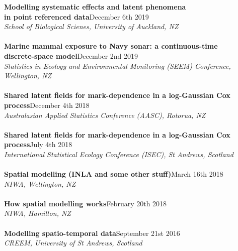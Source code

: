 \documentclass[10pt,letter]{article}
\begin{document}
                           {\textbf{Modelling systematic effects and latent phenomena \\
                                         in point referenced data}}\hfill December 6th 2019\\
                                     {\sl School of Biological Scienes, University of Auckland, NZ}\\
                                     \hdashrule[0.5ex]{4cm}{1pt}{1pt}\\
                                               {\textbf{Marine mammal exposure to Navy sonar: a continuous-time \\
                                                   discrete-space model}}\hfill December 2nd 2019\\
                                               {\sl Statistics in Ecology and Environmental Monitoring (SEEM) Conference, Wellington, NZ}\\
                                               \hdashrule[0.5ex]{4cm}{1pt}{1pt}\\
                                                         {\textbf{Shared latent fields for mark-dependence in a log-Gaussian Cox process}}\hfill December 4th 2018\\
                                                         {\sl Australasian Applied Statistics Conference (AASC), Rotorua, NZ}\\
 \hdashrule[0.5ex]{4cm}{1pt}{1pt}\\
{\textbf{Shared latent fields for mark-dependence in a log-Gaussian Cox process}}\hfill July 4th 2018\\
 {\sl International Statistical Ecology Conference (ISEC), St Andrews, Scotland}\\
 \hdashrule[0.5ex]{4cm}{1pt}{1pt}\\
{\textbf{Spatial modelling (INLA and some other stuff)}}\hfill March 16th 2018\\
 {\sl NIWA, Wellington, NZ}\\
 \hdashrule[0.5ex]{4cm}{1pt}{1pt}\\
 \noindent
{\textbf{How spatial modelling works}}\hfill February 20th 2018\\
 {\sl NIWA, Hamilton, NZ}\\
\hdashrule[0.5ex]{4cm}{1pt}{1pt}\\
{\textbf{Modelling spatio-temporal data}}\hfill September 21st 2016\\
 {\sl CREEM, University of St Andrews, Scotland}\\
\end{document}
